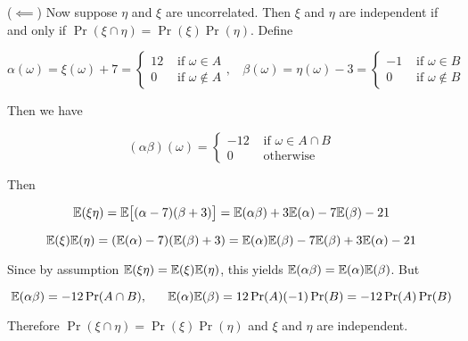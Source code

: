 (\(\impliedby\)) Now suppose \(\eta\) and \(\xi\) are uncorrelated. Then \(\xi\) and \(\eta\) are independent if and only if \(\Pr(\xi \cap \eta) = \Pr(\xi) \Pr(\eta)\). Define

\[
\alpha(\omega) =  \xi(\omega) + 7 = \begin{cases} 
      12 & \text{ if } \omega \in A \\
      0 &  \text{ if } \omega \notin A 
   \end{cases}, \ \ \ \ \beta(\omega) =  \eta(\omega) - 3 = \begin{cases} 
      -1 & \text{ if } \omega \in B \\
      0 &  \text{ if } \omega \notin B 
   \end{cases}
\]

Then we have

\[
(\alpha \beta)(\omega) = \begin{cases} 
      -12 & \text{ if } \omega \in A \cap B \\
      0 &  \text{ otherwise} 
   \end{cases}
\]

Then

\[
\E(\xi \eta) = \E\big[ (\alpha - 7)(\beta + 3)\big] = \E(\alpha \beta) + 3 \E(\alpha) - 7 \E(\beta) - 21
\]

\[
\E(\xi) \E(\eta) = (\E(\alpha) - 7) (\E(\beta) + 3) = \E(\alpha) \E(\beta) - 7 \E(\beta) + 3 \E(\alpha) - 21
\]

Since by assumption \( \E(\xi \eta)  = \E(\xi) \E(\eta) \), this yields \(\E(\alpha \beta) = \E(\alpha) \E(\beta) \). But

\[
\E(\alpha \beta) = -12 \Pr(A \cap B), \ \ \ \ \ \E(\alpha) \E(\beta) = 12 \Pr(A) (-1) \Pr(B) = -12\Pr(A)\Pr(B)
\]

Therefore \(\Pr(\xi \cap \eta) = \Pr(\xi) \Pr(\eta)\) and \(\xi\) and \(\eta\) are independent.

